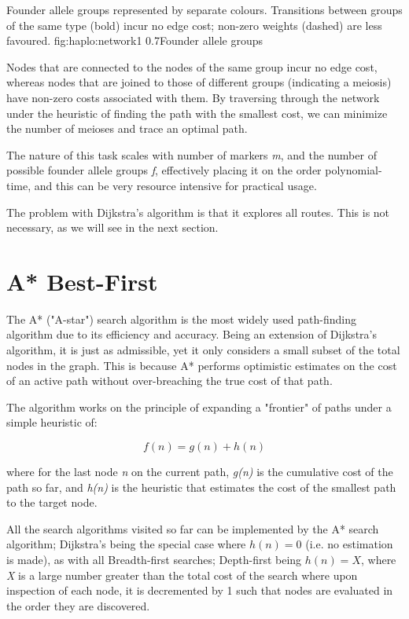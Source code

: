 	{Founder allele groups represented by separate colours. Transitions between groups of the same type (bold) incur no edge cost; non-zero weights (dashed) are less favoured.}
	{fig:haplo:network1}
	{0.7}{Founder allele groups}

Nodes that are connected to the nodes of the same group incur no edge cost, whereas nodes that are joined to those of different groups (indicating a meiosis) have non-zero costs associated with them. By traversing through the network under the heuristic of finding the path with the smallest cost, we can minimize the number of meioses and trace an optimal path.

The nature of this task scales with number of markers \textit{m}, and the number of possible founder allele groups \textit{f}, effectively placing it on the order polynomial-time, and this can be very resource intensive for practical usage.


The problem with Dijkstra's algorithm is that it explores all routes. This is not necessary, as we will see in the next section.

\section{A* Best-First}

The A* ("A-star")  search algorithm is the most widely used path-finding algorithm due to its efficiency and accuracy. Being an extension of Dijkstra’s algorithm, it is just as admissible, yet it only considers a small subset of the total nodes in the graph. This is because A* performs optimistic estimates on the cost of an active path without over-breaching the true cost of that path\citep{astar}.

The algorithm works on the principle of expanding a "frontier" of paths under a simple heuristic of:

\begin{equation}
f(n) = g(n) + h(n)
\end{equation}


where for the last node \textit{n} on the current path, \textit{g(n)} is the cumulative cost of the path so far, and \textit{h(n)} is the heuristic that estimates the cost of the smallest path to the target node.

All the search algorithms visited so far can be implemented by the A* search algorithm; Dijkstra’s being the special case where $h(n)= 0$ (i.e. no estimation is made), as with all Breadth-first searches; Depth-first being $h(n)=X$, where \textit{X} is a large number greater than the total cost of the search where upon inspection of each node, it is decremented by 1 such that nodes are evaluated in the order they are discovered.

